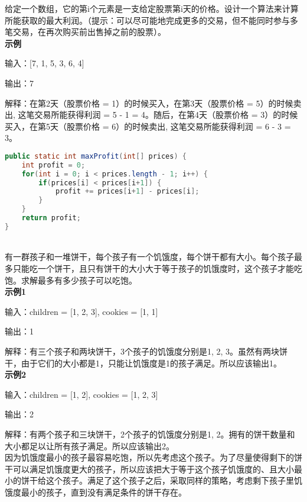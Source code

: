 给定一个数组，它的第i个元素是一支给定股票第i天的价格。设计一个算法来计算所能获取的最大利润。（提示：可以尽可能地完成更多的交易，但不能同时参与多笔交易，在再次购买前出售掉之前的股票）。\\

\textbf{示例}

输入：[7, 1, 5, 3, 6, 4]

输出：7

解释：在第2天（股票价格 = 1）的时候买入，在第3天（股票价格 = 5）的时候卖出, 这笔交易所能获得利润 = 5 - 1 = 4。随后，在第4天（股票价格 = 3）的时候买入，在第5天（股票价格 = 6）的时候卖出, 这笔交易所能获得利润 = 6 - 3 = 3。

\vspace{-0.5cm}

\begin{lstlisting}[language=Java]
public static int maxProfit(int[] prices) {
    int profit = 0;
    for(int i = 0; i < prices.length - 1; i++) {
        if(prices[i] < prices[i+1]) {
            profit += prices[i+1] - prices[i];
        }
    }
    return profit;
}
\end{lstlisting}

\vspace{0.5cm}

\\

有一群孩子和一堆饼干，每个孩子有一个饥饿度，每个饼干都有大小。每个孩子最多只能吃一个饼干，且只有饼干的大小大于等于孩子的饥饿度时，这个孩子才能吃饱。求解最多有多少孩子可以吃饱。\\

\textbf{示例1}

输入：children = [1, 2, 3], cookies = [1, 1]

输出：1

解释：有三个孩子和两块饼干，3个孩子的饥饿度分别是1, 2, 3。虽然有两块饼干，由于它们的大小都是1，只能让饥饿度是1的孩子满足。所以应该输出1。\\

\textbf{示例2}

输入：children = [1, 2], cookies = [1, 2, 3]

输出：2

解释：有两个孩子和三块饼干，2个孩子的饥饿度分别是1, 2。拥有的饼干数量和大小都足以让所有孩子满足。所以应该输出2。\\

因为饥饿度最小的孩子最容易吃饱，所以先考虑这个孩子。为了尽量使得剩下的饼干可以满足饥饿度更大的孩子，所以应该把大于等于这个孩子饥饿度的、且大小最小的饼干给这个孩子。满足了这个孩子之后，采取同样的策略，考虑剩下孩子里饥饿度最小的孩子，直到没有满足条件的饼干存在。\\

